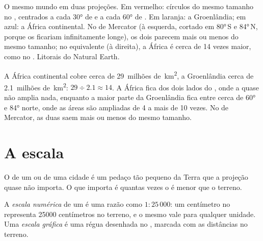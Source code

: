 \begin{omfigure}
{\small O mesmo mundo em duas projeções. Em vermelho: círculos do mesmo
tamanho no , centrados a cada \ang{30} de  e a cada \ang{60}
de . Em laranja: a Groenlândia; em azul: a África continental.
No  de Mercator (à esquerda, cortado em \ang{80}\,S e \ang{84}\,N,
porque os  ficariam infinitamente longe), os dois parecem mais ou
menos do mesmo tamanho; no  equivalente (à direita), a África é cerca
de 14 vezes maior, como no . Litorais do Natural Earth.}
\label{fig:g9:maps-of-the-earth:projections}
\end{omfigure}

\begin{example}
A África continental cobre cerca de 29~milhões de~\unit{km^2}, a
Groenlândia cerca de 2.1~milhões de~\unit{km^2}: $29 \div 2.1 \approx 14$.
A África fica dos dois lados do , onde a  quase
não amplia nada, enquanto a maior parte da Groenlândia fica entre cerca de
\ang{60} e \ang{84} norte, onde as áreas são ampliadas de 4 a mais de 10
vezes. No  de Mercator, as duas saem mais ou menos do mesmo tamanho.
\end{example}

\section{A escala}

O  de um  ou de uma cidade é um pedaço tão pequeno da Terra que a
projeção quase não importa. O que importa é quantas vezes o  é menor
que o terreno.

\begin{definition}\label{def:g9:maps-of-the-earth:numerical-scale}
A \emph{escala numérica} de um
 é uma razão como $1 : 25\,000$: um centímetro no  representa
\num{25000} centímetros no terreno, e o mesmo vale para qualquer unidade.
Uma \emph{escala gráfica} é uma
régua desenhada no , marcada com as distâncias no terreno.
\end{definition}

